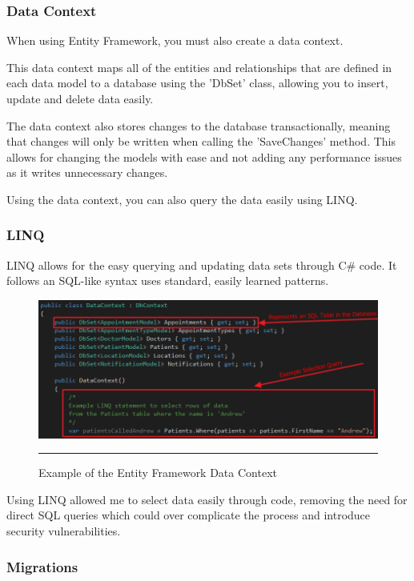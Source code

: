 \subsubsection{Data Context}

When using Entity Framework, you must also create a data context.

This data context maps all of the entities and relationships that are defined in each data model to a database using the 'DbSet' class, allowing you to insert, update and delete data easily.

The data context also stores changes to the database transactionally, meaning that changes will only be written when calling the 'SaveChanges' method. This allows for changing the models with ease and not adding any performance issues as it writes unnecessary changes.

Using the data context, you can also query the data easily using LINQ.

\subsubsection{LINQ}

LINQ allows for the easy querying and updating data sets through C\# code. It follows an SQL-like syntax uses standard, easily learned patterns.

\begin{figure}[htbp]
	\centering
		\includegraphics[width=\textwidth,height=\textheight,keepaspectratio]{Figures/EFContext.png}
		\rule{35em}{0.5pt}
		\caption[Example of the Entity Framework Data Context]{Example of the Entity Framework Data Context}
	\label{fig:efcontext}
\end{figure}

Using LINQ allowed me to select data easily through code, removing the need for direct SQL queries which could over complicate the process and introduce security vulnerabilities.

\subsubsection{Migrations}

